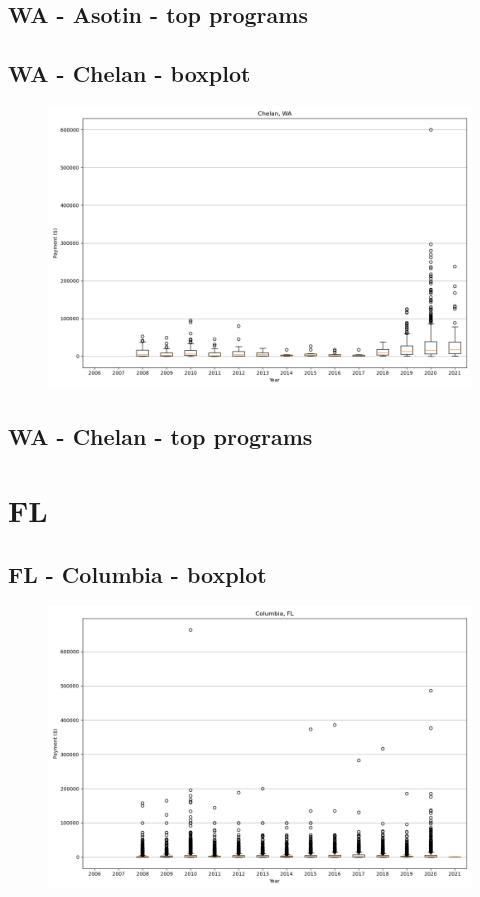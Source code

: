 \subsection*{WA - Asotin - top programs}

\newpage
\subsection*{WA - Chelan - boxplot}
\begin{figure}[h]
\centering
\includegraphics[width=7in]{../output/boxplots/counties/Chelan-WA_boxplot.png}
\end{figure}


\subsection*{WA - Chelan - top programs}

\newpage
\section*{FL}
\subsection*{FL - Columbia - boxplot}
\begin{figure}[h]
\centering
\includegraphics[width=7in]{../output/boxplots/counties/Columbia-FL_boxplot.png}
\end{figure}


